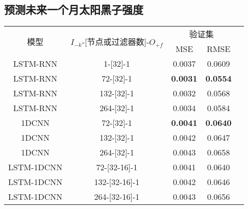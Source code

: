\subsection{预测未来一个月太阳黑子强度}\label{sec:ss_result_one}

\begin{table}[!htbp]
    \centering
    \label{tab:ss_number_out_1}
    \footnotesize
    \renewcommand{\arraystretch}{1}
    \begin{tabular}{ccccc}
      \toprule
      \multirow{2}{*}{模型} & \multirow{2}{*}{$I_{-k}$-[节点或过滤器数]-$O_{+f}$} & \multicolumn{2}{c}{验证集}\\
      \cmidrule(lr){3-4}
      \noalign{\smallskip}
      & & MSE & RMSE\\
      \midrule 
      LSTM-RNN & 1-[32]-1 & 0.0037 & 0.0609 \\
      LSTM-RNN & 72-[32]-1 & \textbf{0.0031} & \textbf{0.0554} \\
      LSTM-RNN & 132-[32]-1 & 0.0032 & 0.0568 \\
      LSTM-RNN & 264-[32]-1 & 0.0034 & 0.0584 \\
      \hline
      1DCNN & 72-[32]-1 & \textbf{0.0041} & \textbf{0.0640} \\
      1DCNN & 132-[32]-1 & 0.0042 & 0.0647 \\
      1DCNN & 264-[32]-1 & 0.0043 & 0.0658 \\
      \hline
      LSTM-1DCNN & 72-[32-16]-1 & 0.0041 & 0.0640 \\
      LSTM-1DCNN & 132-[32-16]-1 & 0.0042 & 0.0646 \\
      LSTM-1DCNN & 264-[32-16]-1 & 0.0043 & 0.0656 \\
      \bottomrule
    \end{tabular}
  \end{table}

